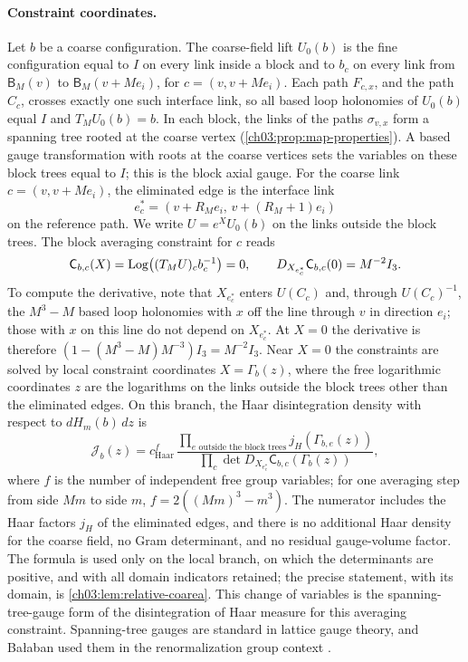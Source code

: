 \paragraph{Constraint coordinates.}
Let $b$ be a coarse configuration. The coarse-field lift $U_0(b)$ is the fine configuration equal to $I$ on every link inside a block and to $b_c$ on every link from $\mathsf B_M(v)$ to $\mathsf B_M(v+Me_i)$, for $c=(v,v+Me_i)$. Each path $F_{c,x}$, and the path $C_c$, crosses exactly one such interface link, so all based loop holonomies of $U_0(b)$ equal $I$ and $T_MU_0(b)=b$. In each block, the links of the paths $\sigma_{v,x}$ form a spanning tree rooted at the coarse vertex (\cref{ch03:prop:map-properties}). A based gauge transformation with roots at the coarse vertices sets the variables on these block trees equal to $I$; this is the block axial gauge. For the coarse link $c=(v,v+Me_i)$, the eliminated edge is the interface link
\[
 e^*_c=(v+R_Me_i,\,v+(R_M+1)e_i)
\]
on the reference path. We write $U=e^XU_0(b)$ on the links outside the block trees. The block averaging constraint for $c$ reads
\[
 \mathsf C_{b,c}(X)=\operatorname{Log}\bigl((T_MU)_cb_c^{-1}\bigr)=0,\qquad D_{X_{e^*_c}}\mathsf C_{b,c}(0)=M^{-2}I_3.
\]
To compute the derivative, note that $X_{e^*_c}$ enters $U(C_c)$ and, through $U(C_c)^{-1}$, the $M^3-M$ based loop holonomies with $x$ off the line through $v$ in direction $e_i$; those with $x$ on this line do not depend on $X_{e^*_c}$. At $X=0$ the derivative is therefore $(1-(M^3-M)M^{-3})I_3=M^{-2}I_3$. Near $X=0$ the constraints are solved by local constraint coordinates $X=\Gamma_b(z)$, where the free logarithmic coordinates $z$ are the logarithms on the links outside the block trees other than the eliminated edges. On this branch, the Haar disintegration density with respect to $dH_m(b)\,dz$ is
\begin{equation}\label{ch01:eq:haar-disintegration}
 \mathscr J_b(z)=c_{\mathrm{Haar}}^{f}\,
 \frac{\prod_{e\text{ outside the block trees}}j_H(\Gamma_{b,e}(z))}{\prod_c\det D_{X_{e^*_c}}\mathsf C_{b,c}(\Gamma_b(z))},
\end{equation}
where $f$ is the number of independent free group variables; for one averaging step from side $Mm$ to side $m$, $f=2((Mm)^3-m^3)$. The numerator includes the Haar factors $j_H$ of the eliminated edges, and there is no additional Haar density for the coarse field, no Gram determinant, and no residual gauge-volume factor. The formula is used only on the local branch, on which the determinants are positive, and with all domain indicators retained; the precise statement, with its domain, is \cref{ch03:lem:relative-coarea}. This change of variables is the spanning-tree-gauge form of the disintegration of Haar measure for this averaging constraint. Spanning-tree gauges are standard in lattice gauge theory, and Bałaban used them in the renormalization group context \cite{Balaban1985Regular}.

